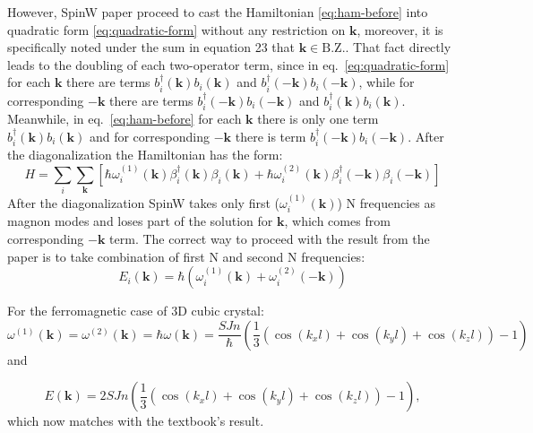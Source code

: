 \documentclass[a4paper,12pt]{article}
\begin{document}
        However, SpinW paper proceed to cast the Hamiltonian \eqref{eq:ham-before} into quadratic form \eqref{eq:quadratic-form} without any restriction on $\boldsymbol{k}$,
        moreover, it is specifically noted under the sum in equation 23 that $\boldsymbol{k} \in \text{B.Z.}$. 
        That fact directly leads to the doubling of each two-operator term, since in eq.~\eqref{eq:quadratic-form} for each $\boldsymbol{k}$ 
        there are terms $b^{\dag}_i(\boldsymbol{k})b_i(\boldsymbol{k})$ and $b^{\dag}_i(-\boldsymbol{k})b_i(-\boldsymbol{k})$, 
        while for corresponding $-\boldsymbol{k}$ there are terms $b^{\dag}_i(-\boldsymbol{k})b_i(-\boldsymbol{k})$ and $b^{\dag}_i(\boldsymbol{k})b_i(\boldsymbol{k})$. 
        Meanwhile, in eq.~\eqref{eq:ham-before} for each $\boldsymbol{k}$ 
        there is only one term $b^{\dag}_i(\boldsymbol{k})b_i(\boldsymbol{k})$ and for corresponding $-\boldsymbol{k}$ there is term $b^{\dag}_i(-\boldsymbol{k})b_i(-\boldsymbol{k})$.
        After the diagonalization the Hamiltonian has the form:
        \begin{equation}
            H = \sum_{i}\sum_{\boldsymbol{k}}\left[
                \hbar\omega^{(1)}_i(\boldsymbol{k})\beta^{\dag}_i(\boldsymbol{k})\beta_i(\boldsymbol{k}) +
                \hbar\omega^{(2)}_i(\boldsymbol{k})\beta^{\dag}_i(-\boldsymbol{k})\beta_i(-\boldsymbol{k})\right]
        \end{equation}
        After the diagonalization SpinW takes only first 
        ($\omega^{(1)}_i(\boldsymbol{k})$) N frequencies as magnon modes and
        loses part of the solution for $\boldsymbol{k}$, which comes from corresponding $-\boldsymbol{k}$ term. 
        The correct way to proceed with the result from the paper is to take combination of first N and second N frequencies:
        \begin{equation}
            E_i(\boldsymbol{k}) = \hbar(\omega_i^{(1)}(\boldsymbol{k}) + \omega_i^{(2)}(-\boldsymbol{k}))
        \end{equation}

        For the ferromagnetic case of 3D cubic crystal:
        \begin{equation}
            \omega^{(1)}(\boldsymbol{k}) = \omega^{(2)}(\boldsymbol{k}) = \hbar\omega(\boldsymbol{k}) = \dfrac{SJn}{\hbar}\left(\dfrac{1}{3}\left(\cos(k_xl) + \cos(k_yl) + \cos(k_zl)\right) - 1\right)
        \end{equation}
        and

        \begin{equation}
            E(\boldsymbol{k}) = 2SJn\left(\dfrac{1}{3}\left(\cos(k_xl) + \cos(k_yl) + \cos(k_zl)\right) - 1\right),
        \end{equation}
        which now matches with the textbook's result.
\end{document}
